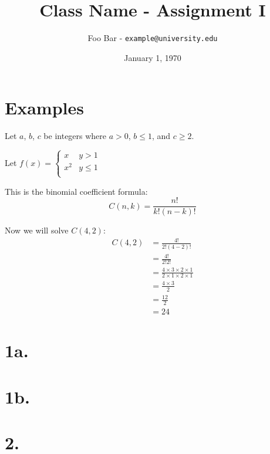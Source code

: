\documentclass[11pt, oneside]{article}   	%
\title{Class Name - Assignment I} %
\author{Foo Bar - \texttt{example@university.edu}} %
\date{January 1, 1970} %
\begin{document}

\section*{Examples}

Let $a$, $b$, $c$ be integers where $a > 0$, $b \leq 1$, and $c \geq 2$.

Let $f(x) = \begin{cases}
x & y > 1 \\
x^2 & y \leq 1 \\
\end{cases}$

This is the binomial coefficient formula:
\[
C(n, k) = \frac{n!}{k!(n - k)!}
\]

Now we will solve $C(4, 2)$:
\begingroup
\allowdisplaybreaks %
\addtolength{\jot}{.25em} %
\begin{align*} %
C(4, 2) &= \frac{4!}{2!(4 - 2)!} \tag*{def. of binomial coefficient} \\ 
  &= \frac{4!}{2!2!} \tag*{simplify} \\ 
  &= \frac{4 \times 3 \times 2 \times 1}{2 \times 1 \times 2 \times 1}  \tag*{expand} \\ 
  &= \frac{4 \times 3}{2}  \tag*{eliminate common terms} \\ 
  &= \frac{12}{2} \tag*{simplify} \\ 
  &= 24
\end{align*}
\endgroup

\section*{1a.}
\section*{1b.}
\section*{2.}
\end{document}
